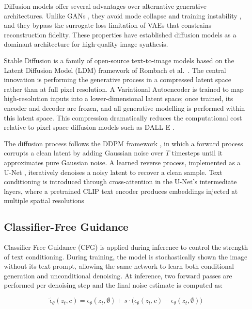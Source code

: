 Diffusion models offer several advantages over alternative generative architectures.
Unlike GANs \cite{Goodfellow_2014_GAN}, they avoid mode collapse and training instability
\cite{Dhariwal_2021_DiffusionBeatGANs}, and they bypass the surrogate loss limitation of
VAEs \cite{Kingma_2013_VAE} that constrains reconstruction fidelity. These properties have
established diffusion models as a dominant architecture for high-quality image synthesis.

Stable Diffusion is a family of open-source text-to-image models based on the Latent
Diffusion Model (LDM) framework of Rombach et al.~\cite{Rombach_2022_CVPR}. The central
innovation is performing the generative process in a compressed latent space rather than
at full pixel resolution. A Variational Autoencoder \cite{Kingma_2013_VAE} is trained to
map high-resolution inputs into a lower-dimensional latent space; once trained, its
encoder and decoder are frozen, and all generative modelling is performed within this
latent space. This compression dramatically reduces the computational cost relative to
pixel-space diffusion models such as DALL-E \cite{Ramesh_2021_DALLE}.

The diffusion process follows the DDPM framework \cite{Ho_2020_DDPM}, in which a forward
process corrupts a clean latent by adding Gaussian noise over $T$ timesteps until it
approximates pure Gaussian noise. A learned reverse process, implemented as a U-Net
\cite{Ronneberger_2015_UNet}, iteratively denoises a noisy latent to recover a clean
sample. Text conditioning is introduced through cross-attention in the U-Net's intermediate layers, where a pretrained CLIP text encoder \cite{Radford_2021_CLIP} produces embeddings injected at multiple spatial resolutions

\subsection*{Classifier-Free Guidance}
\label{subsec:cfg}

Classifier-Free Guidance (CFG) \cite{Ho_2022_CFG} is applied during inference to
control the strength of text conditioning. During training, the model is stochastically shown
the image without its text prompt, allowing the same network to learn both conditional
generation and unconditional denoising. At inference, two forward passes are performed per denoising step and the final noise estimate is computed as:

\begin{equation}
	\tilde{\epsilon}_\theta(z_t, c) = \epsilon_\theta(z_t, \emptyset)
	+ s \cdot \bigl(\epsilon_\theta(z_t, c) -
	\epsilon_\theta(z_t, \emptyset)\bigr)
\end{equation}

